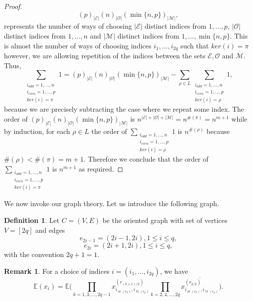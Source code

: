 \documentclass{article}
\theoremstyle{definition}
\newtheorem{remark}     [theorem]{Remark}
\newtheorem{definition} [theorem]{Definition}
\begin{document}
{\begin{proof}
$$(p)_{|\mathcal{E}|}(n)_{|\mathcal{O}|}(\min\{n,p\})_{|\mathcal{M}|},$$
represents the number of ways of choosing $|\mathcal{E}|$ distinct indices from $1,\dots,p$, $|\mathcal{O}|$ distinct indices from $1,\dots,n$ and $|\mathcal{M}|$ distinct indices from $1,\dots,\min\{n,p\}$. This is almost the number of ways of choosing indices $i_1,\dots,i_{2q}$ such that $ker(i)=\pi$ however, we are allowing repetition of the indices between the sets $\mathcal{E},\mathcal{O}$ and $\mathcal{M}$. Thus,
$$\sum_{\substack{i_{odd}=1,\dots,n \\ i_{even}=1,\dots,p \\ ker(i)=\pi}}1=(p)_{|\mathcal{E}|}(n)_{|\mathcal{O}|}(\min\{n,p\})_{|\mathcal{M}|}-\sum_{\rho\in L}\sum_{\substack{i_{odd}=1,\dots,n \\ i_{even}=1,\dots,p \\ ker(i)=\rho}}1,$$
because we are precisely subtracting the case where we repeat some index.
The order of $(p)_{|\mathcal{E}|}(n)_{|\mathcal{O}|}(\min\{n,p\})_{|\mathcal{M}|}$ is $n^{|\mathcal{E}|+|\mathcal{O}|+|\mathcal{M}|}=n^{\#(\pi)}=n^{m+1}$ while by induction, for each $\rho\in L$ the order of $\sum_{\substack{i_{odd}=1,\dots,n \\ i_{even}=1,\dots,p \\ ker(i)=\rho}}1$ is $n^{\#(\rho)}$ because $\#(\rho)<\#(\pi)=m+1$. Therefore we conclude that the order of $\sum_{\substack{i_{odd}=1,\dots,n \\ i_{even}=1,\dots,p \\ ker(i)=\pi}}1$ is $n^{m+1}$ as required.
\end{proof}

We now invoke our graph theory. Let us introduce the following graph.

\begin{definition}\label{Definition: T graph of Wishart}
Let $C=(V,E)$ be the oriented graph with set of vertices $V=[2q]$ and edges
$$e_{2i-1}=(2i-1,2i), 1\leq i\leq q,$$
$$e_{2i}=(2i+1,2i), 1\leq i\leq q,$$
with the convention $2q+1=1$.
\end{definition}

\begin{remark}\label{Remark: Expectation depending on the graph}
For a choice of indices $i=(i_1,\ldots,i_{2q})$, we have
\[
\mathbb{E}(x_i)
=
\mathbb{E}\Bigg(
    \prod_{k=1,3,\ldots,2q-1}
    x_{i_{\operatorname{sr}(e_k)},
       i_{\operatorname{tr}(e_k)}}^{(r_{(k+1)/2})}
    \prod_{k=2,4,\ldots,2q}
    \overline{
        x_{i_{\operatorname{sr}(e_k)},
           i_{\operatorname{tr}(e_k)}}^{(r_{k/2})}
    }
\Bigg).
\]
\end{remark}

}
\end{document}
